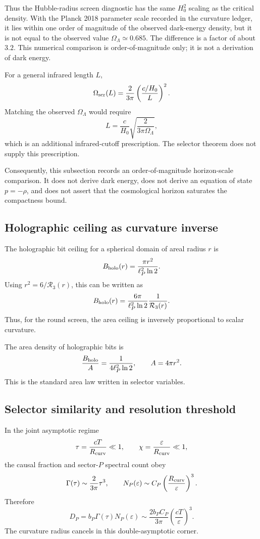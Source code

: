 \documentclass[11pt,a4paper]{article}
\begin{document}
Thus the Hubble-radius screen diagnostic has the same \(H_0^2\) scaling as the critical density.  With the Planck 2018 parameter scale recorded in the curvature ledger, it lies within one order of magnitude of the observed dark-energy density, but it is not equal to the observed value \(\Omega_\Lambda\simeq0.685\).  The difference is a factor of about \(3.2\).  This numerical comparison is order-of-magnitude only; it is not a derivation of dark energy.

For a general infrared length \(L\),
\[
\Omega_{\rm scr}(L)
=
\frac{2}{3\pi}
\left(
\frac{c/H_0}{L}
\right)^2.
\]
Matching the observed \(\Omega_\Lambda\) would require
\[
L
=
\frac{c}{H_0}
\sqrt{
\frac{2}{3\pi\Omega_\Lambda}
},
\]
which is an additional infrared-cutoff prescription.  The selector theorem does not supply this prescription.

Consequently, this subsection records an order-of-magnitude horizon-scale comparison.  It does not derive dark energy, does not derive an equation of state \(p=-\rho\), and does not assert that the cosmological horizon saturates the compactness bound.

\subsection{Holographic ceiling as curvature inverse}

The holographic bit ceiling for a spherical domain of areal radius \(r\) is
\[
B_{\rm holo}(r)
=
\frac{\pi r^2}{\ell_P^2\ln2}.
\]
Using \(r^2=6/\mathcal R_3(r)\), this can be written as
\[
B_{\rm holo}(r)
=
\frac{6\pi}{\ell_P^2\ln2}
\frac1{\mathcal R_3(r)}.
\]
Thus, for the round screen, the area ceiling is inversely proportional to scalar curvature.

The area density of holographic bits is
\[
\frac{B_{\rm holo}}{A}
=
\frac{1}{4\ell_P^2\ln2},
\qquad
A=4\pi r^2.
\]
This is the standard area law written in selector variables.

\subsection{Selector similarity and resolution threshold}

In the joint asymptotic regime
\[
\tau=\frac{cT}{R_{\rm curv}}\ll1,
\qquad
\chi=\frac{\varepsilon}{R_{\rm curv}}\ll1,
\]
the causal fraction and sector-\(P\) spectral count obey
\[
\Gamma(\tau)\sim\frac{2}{3\pi}\tau^3,
\qquad
N_P(\varepsilon)\sim C_P\left(\frac{R_{\rm curv}}{\varepsilon}\right)^3.
\]
Therefore
\[
D_P=b_P\Gamma(\tau)N_P(\varepsilon)
\sim
\frac{2b_PC_P}{3\pi}
\left(\frac{cT}{\varepsilon}\right)^3.
\]
The curvature radius cancels in this double-asymptotic corner.
\end{document}
